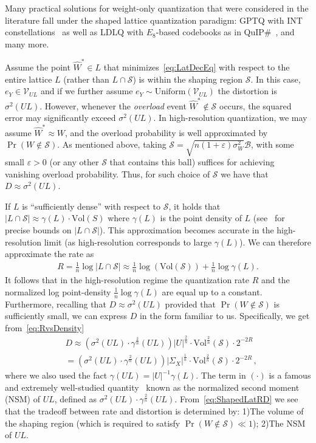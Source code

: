 \documentclass[journal]{IEEEtran}
\newcommand{\Vol}{\mathrm{Vol}}
\newcommand{\eps}{\varepsilon}
\newcommand{\Unif}{\mathrm{Uniform}}
\newcommand{\m}{\mathcal}
\begin{document}
Many practical solutions for weight-only quantization that were considered in the literature fall
under the shaped lattice quantization paradigm: GPTQ with INT
constellations~\cite{frantar2023optq} as well as LDLQ with $E_8$-based codebooks as in
QuIP\#~\cite{chee2023quip,tseng2024quip}, and many more.


Assume the point $\hat{W}^*\in L$ that minimizes~\eqref{eq:LatDecEq} with respect to the entire
lattice $L$ (rather than $L\cap \m{S}$) is within the shaping region $\m{S}$. In this case,
$e_Y\in\m{V}_{UL}$ and if we further assume $e_Y\sim\Unif(\m{V}_{UL})$ the distortion is
$\sigma^2(UL)$. However, whenever the
\emph{overload} event $\hat{W}^*\notin\m{S}$ occurs, the squared error may significantly exceed
$\sigma^2(UL)$. In high-resolution quantization, we may assume $\hat{W}^*\approx W$, and the
overload probability is well approximated by $\Pr(W\notin\m{S})$. As mentioned above, taking
$\m{S}=\sqrt{n(1+\eps)\sigma_W^2}\m{B}$, with some small $\eps>0$ (or any other $\m{S}$ that
contains this ball) suffices for achieving vanishing overload probability. Thus, for such choice
of $\m{S}$ we have that $D\approx \sigma^2(UL)$.

If $L$ is ``sufficiently dense'' with respect to $\m{S}$, it holds that $|L\cap \m{S}|\approx \gamma(L)\cdot\Vol(S)$ where $\gamma(L)$ is the point density of $L$ (see~\cite[Lemma 3.3]{ordentlich2023bounds} for precise bounds on $|L\cap \m{S}|$). This approximation becomes accurate in the high-resolution limit (as high-resolution corresponds to large $\gamma(L)$).  
We can therefore approximate the rate as 
\begin{align}
R=\frac{1}{n}\log|L\cap \m{S}|\approx \frac{1}{n}\log(\Vol(\m{S}))+\frac{1}{n}\log \gamma(L).    
\label{eq:RvsDensity}
\end{align} 
It follows that in the high-resolution regime the quantization rate $R$ and the normalized log
point-density $\frac{1}{n}\log\gamma(L)$ are equal up to a constant. Furthermore, recalling that
$D\approx\sigma^2(UL)$ provided that $\Pr(W\notin\m{S})$ is sufficiently small, we can express $D$
in the form familiar to us. Specifically, we get from~\eqref{eq:RvsDensity} 
\begin{align}
&D\approx \left(\sigma^2(UL)\cdot \gamma^{\frac{2}{n}}(UL) \right)|U|^{\frac{2}{n}}\cdot \Vol^{\frac{2}{n}}(\m{S})\cdot 2^{-2R}\nonumber\\
&=\left(\sigma^2(UL)\cdot \gamma^{\frac{2}{n}}(UL) \right) |\Sigma_X|^{\frac{1}{n}}\cdot
\Vol^{\frac{2}{n}}(\m{S})\cdot 2^{-2R}\,,
\label{eq:ShapedLatRD}
\end{align}
where we also used the fact $\gamma(UL) = |U|^{-1} \gamma(L)$. The term in $(\cdot)$ is a famous
and extremely well-studied quantity~\cite{ramiBook} known as the normalized second moment (NSM) of $UL$, defined as $\sigma^2(UL)\cdot
\gamma^{\frac{2}{n}}(UL)$. From~\eqref{eq:ShapedLatRD} we see that the tradeoff between rate and distortion is
determined by: 1)The volume of the shaping region (which is required to satisfy
$\Pr(W\notin\m{S})\ll 1$);  2)The NSM of $UL$.
\end{document}
